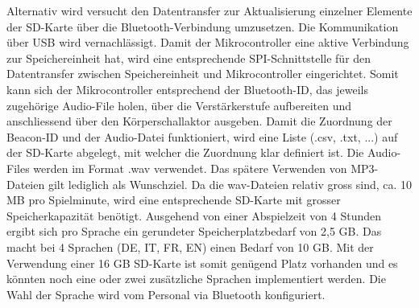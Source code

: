 Alternativ wird versucht den Datentransfer zur Aktualisierung einzelner Elemente der SD-Karte über die Bluetooth-Verbindung umzusetzen. Die Kommunikation über USB wird vernachlässigt. Damit der Mikrocontroller eine aktive Verbindung zur Speichereinheit hat, wird eine entsprechende SPI-Schnittstelle für den Datentransfer zwischen Speichereinheit und Mikrocontroller eingerichtet. Somit kann sich der Mikrocontroller entsprechend der Bluetooth-ID, das jeweils zugehörige Audio-File holen, über die Verstärkerstufe aufbereiten und anschliessend über den Körperschallaktor ausgeben. Damit die Zuordnung der Beacon-ID und der Audio-Datei funktioniert, wird eine Liste (.csv, .txt, ...) auf der SD-Karte abgelegt, mit welcher die Zuordnung klar definiert ist. Die Audio-Files werden im Format .wav verwendet. Das spätere Verwenden von MP3-Dateien gilt lediglich als Wunschziel. Da die wav-Dateien relativ gross sind, ca. 10 MB pro Spielminute, wird eine entsprechende SD-Karte mit grosser Speicherkapazität benötigt. Ausgehend von einer Abspielzeit von 4 Stunden ergibt sich pro Sprache ein gerundeter Speicherplatzbedarf von 2,5 GB. Das macht bei 4 Sprachen (DE, IT, FR, EN) einen Bedarf von 10 GB. Mit der Verwendung einer 16 GB SD-Karte ist somit genügend Platz vorhanden und es könnten noch eine oder zwei zusätzliche Sprachen implementiert werden. Die Wahl der Sprache wird vom Personal via Bluetooth konfiguriert.
